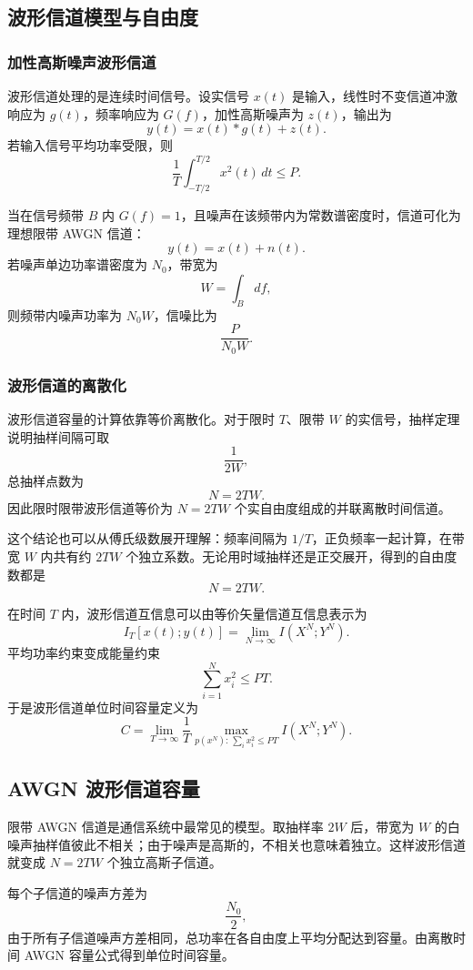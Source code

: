 \subsection{波形信道模型与自由度}

\subsubsection{加性高斯噪声波形信道}

波形信道处理的是连续时间信号。设实信号 $x(t)$ 是输入，线性时不变信道冲激响应为 $g(t)$，频率响应为 $G(f)$，加性高斯噪声为 $z(t)$，输出为
\[
y(t)=x(t)*g(t)+z(t).
\]
若输入信号平均功率受限，则
\[
\frac1T\int_{-T/2}^{T/2}x^2(t)\,dt\le P.
\]

当在信号频带 $B$ 内 $G(f)=1$，且噪声在该频带内为常数谱密度时，信道可化为理想限带 AWGN 信道：
\[
y(t)=x(t)+n(t).
\]
若噪声单边功率谱密度为 $N_0$，带宽为
\[
W=\int_B df,
\]
则频带内噪声功率为 $N_0W$，信噪比为
\[
\frac{P}{N_0W}.
\]

\subsubsection{波形信道的离散化}

波形信道容量的计算依靠等价离散化。对于限时 $T$、限带 $W$ 的实信号，抽样定理说明抽样间隔可取
\[
\frac{1}{2W},
\]
总抽样点数为
\[
N=2TW.
\]
因此限时限带波形信道等价为 $N=2TW$ 个实自由度组成的并联离散时间信道。

这个结论也可以从傅氏级数展开理解：频率间隔为 $1/T$，正负频率一起计算，在带宽 $W$ 内共有约 $2TW$ 个独立系数。无论用时域抽样还是正交展开，得到的自由度数都是
\[
N=2TW.
\]

在时间 $T$ 内，波形信道互信息可以由等价矢量信道互信息表示为
\[
I_T[x(t);y(t)]=\lim_{N\to\infty}I(X^N;Y^N).
\]
平均功率约束变成能量约束
\[
\sum_{i=1}^{N}x_i^2\le PT.
\]
于是波形信道单位时间容量定义为
\[
C=\lim_{T\to\infty}\frac1T\max_{p(x^N):\,\sum_i x_i^2\le PT} I(X^N;Y^N).
\]

\subsection{AWGN 波形信道容量}

限带 AWGN 信道是通信系统中最常见的模型。取抽样率 $2W$ 后，带宽为 $W$ 的白噪声抽样值彼此不相关；由于噪声是高斯的，不相关也意味着独立。这样波形信道就变成 $N=2TW$ 个独立高斯子信道。

每个子信道的噪声方差为
\[
\frac{N_0}{2},
\]
由于所有子信道噪声方差相同，总功率在各自由度上平均分配达到容量。由离散时间 AWGN 容量公式得到单位时间容量。

